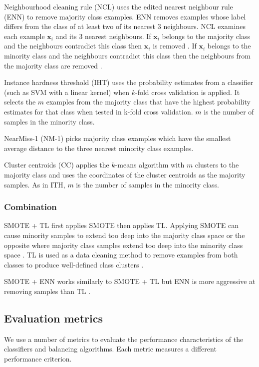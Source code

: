 \documentclass{sig-alternate-05-2015}
\begin{document}
	Neighbourhood cleaning rule (NCL) \cite{Laurikkala:2001:IID:648155.757340} uses the edited nearest neighbour rule (ENN) to remove majority class examples. ENN removes examples whose label differs from the class of at least two of its nearest 3 neighbours. NCL examines each example $\textbf{x}_i$ and its 3 nearest neighbours. If $\textbf{x}_i$ belongs to the majority class and the neighbours contradict this class then $\textbf{x}_i$ is removed \cite{Batista:2004:SBS:1007730.1007735}. If $\textbf{x}_i$ belongs to the minority class and the neighbours contradict this class then the neighbours from the majority class are removed \cite{Batista:2004:SBS:1007730.1007735}.
	
	Instance hardness threshold (IHT) \cite{Smith:2014:ILA:2843614.2843686} uses the probability estimates from a classifier (such as SVM with a linear kernel) when $k$-fold cross validation is applied. It selects the $m$ examples from the majority class that have the highest probability estimates for that class when tested in k-fold cross validation. $m$ is the number of samples in the minority class.
	
	NearMiss-1 (NM-1) \cite{mani2003knn} picks majority class examples which have the smallest average distance to the three nearest minority class examples.
	
	Cluster centroids (CC) applies the $k$-means algorithm with $m$ clusters to the majority class and uses the coordinates of the cluster centroids as the majority samples. As in ITH, $m$ is the number of samples in the minority class.	
	
	\subsubsection{Combination}
	SMOTE + TL \cite{batista2003balancing} first applies SMOTE then applies TL. Applying SMOTE can cause minority samples to extend too deep into the majority class space or the opposite where majority class samples extend too deep into the minority class space \cite{batista2003balancing}. TL is used as a data cleaning method to remove examples from both classes to produce well-defined class clusters \cite{batista2003balancing}.
	
	SMOTE + ENN works similarly to SMOTE + TL but ENN is more aggressive at removing samples than TL \cite{Batista:2004:SBS:1007730.1007735}.
	
	\subsection{Evaluation metrics}
	We use a number of metrics to evaluate the performance characteristics of the classifiers and balancing algorithms. Each metric measures a different performance criterion.
	
\end{document}
